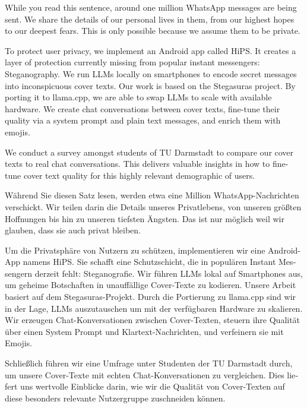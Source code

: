 
\begingroup
\let\clearpage\relax
\let\cleardoublepage\relax
\let\cleardoublepage\relax

While you read this sentence, around one million WhatsApp messages are being sent. We share the details of our personal lives in them, from our highest hopes to our deepest fears. This is only possible because we assume them to be private.

To protect user privacy, we implement an Android app called \gls{HiPS}. It creates a layer of protection currently missing from popular instant messengers: Steganography. We run \glspl{LLM} locally on smartphones to encode secret messages into inconspicuous cover texts. Our work is based on the Stegasuras project. By porting it to llama.cpp, we are able to swap \glspl{LLM} to scale with available hardware. We create chat conversations between cover texts, fine-tune their quality via a system prompt and plain text messages, and enrich them with emojis.

We conduct a survey amongst students of TU Darmstadt to compare our cover texts to real chat conversations. This delivers valuable insights in how to fine-tune cover text quality for this highly relevant demographic of users.

\vfill

\begin{otherlanguage}{ngerman}
Während Sie diesen Satz lesen, werden etwa eine Million WhatsApp-Nachrichten verschickt. Wir teilen darin die Details unseres Privatlebens, von unseren größten Hoffnungen bis hin zu unseren tiefsten Ängsten. Das ist nur möglich weil wir glauben, dass sie auch privat bleiben.

Um die Privatsphäre von Nutzern zu schützen, implementieren wir eine Android-App namens \gls{HiPS}. Sie schafft eine Schutzschicht, die in populären Instant Messengern derzeit fehlt: Steganografie. Wir führen \glspl{LLM} lokal auf Smartphones aus, um geheime Botschaften in unauffällige Cover-Texte zu kodieren. Unsere Arbeit basiert auf dem Stegasuras-Projekt. Durch die Portierung zu llama.cpp sind wir in der Lage, \glspl{LLM} auszutauschen um mit der verfügbaren Hardware zu skalieren. Wir erzeugen Chat-Konversationen zwischen Cover-Texten, steuern ihre Qualität über einen System Prompt und Klartext-Nachrichten, und verfeinern sie mit Emojis.

Schließlich führen wir eine Umfrage unter Studenten der TU Darmstadt durch, um unsere Cover-Texte mit echten Chat-Konversationen zu vergleichen. Dies liefert uns wertvolle Einblicke darin, wie wir die Qualität von Cover-Texten auf diese besonders relevante Nutzergruppe zuschneiden können.
\end{otherlanguage}

\endgroup

\vfill
